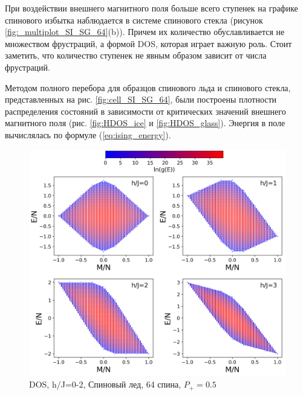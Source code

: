 \documentclass[utf8, babel, sor, jor, amsmath, amssymb, reprint]{elsarticle} %
\begin{document}
При воздействии внешнего магнитного поля больше всего ступенек на графике спинового избытка наблюдается в системе спинового стекла (рисунок \ref{fig:_multiplot_SI_SG_64}(b)). Причем их количество обуславливается не множеством фрустраций, а формой DOS, которая играет важную роль.
Стоит заметить, что количество ступенек не явным образом зависит от числа фрустраций.


Методом полного перебора для образцов спинового льда и спинового стекла, представленных на рис. \ref{fig:cell_SI_SG_64}, были построены плотности распределения состояний в зависимости от критических значений внешнего магнитного поля (рис. \ref{fig:HDOS_ice} и \ref{fig:HDOS_glass}).
Энергия в поле вычислялась по формуле (\ref{eq:ising_energy}).




\begin{figure}[H]
	\centering
	\includegraphics[width=1\linewidth]{pictures/HDOS_SI_64_J0_1.png}
	\caption{DOS, h/J=0-2, Спиновый лед, 64 спина, $P_+ = 0.5$}
	\label{fig:HDOS_ice_1}
\end{figure}
\end{document}
